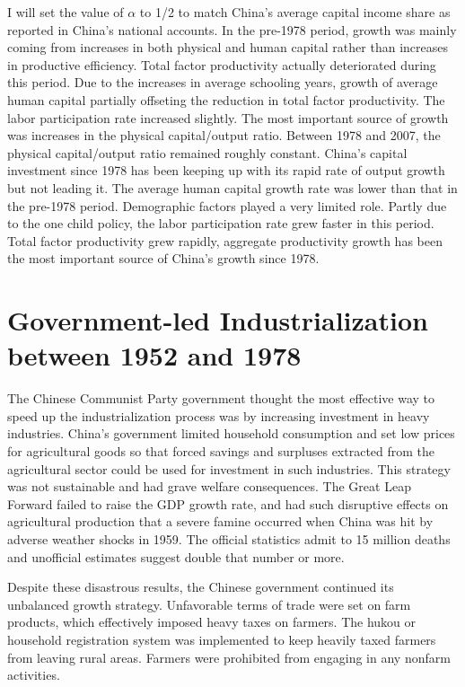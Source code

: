 \documentclass{article}
\begin{document}
    I will set the value of $\alpha$ to 1/2 to match China’s average capital income share as reported in China’s national accounts. In the pre-1978 period, growth was mainly coming from increases in both physical and human capital rather than increases in productive efficiency. Total factor productivity actually deteriorated during this period. Due to the increases in average schooling years, growth of average human capital partially offseting the reduction in total factor productivity. The labor participation rate increased slightly. The most important source of growth was increases in the physical capital/output ratio. Between 1978 and 2007, the physical capital/output ratio remained roughly constant. China’s  capital investment since 1978 has been keeping up with its rapid rate of output growth but not leading it. The average human capital growth rate was lower than that in the pre-1978 period. Demographic factors played a very limited role. Partly due to the one child policy, the labor participation rate grew faster in this period. Total factor productivity grew rapidly, aggregate productivity growth has been the most important source of China’s growth since 1978.
    
    \section*{Government-led Industrialization between 1952 and 1978}
    The Chinese Communist Party government thought the most effective way to speed up the industrialization process was by increasing investment in heavy industries. China’s government limited household consumption and set low prices for agricultural goods so that forced savings and surpluses extracted from the agricultural sector could be used for investment in such industries. This strategy was not sustainable and had grave welfare consequences. The Great Leap Forward failed to raise the GDP growth rate, and had such disruptive effects on agricultural production that a severe famine occurred when China was hit by adverse weather shocks in 1959. The official statistics admit to 15 million deaths and unofficial estimates suggest double that number or more.

    Despite these disastrous results, the Chinese government continued its unbalanced growth strategy. Unfavorable terms of trade were set on farm products, which effectively imposed heavy taxes on farmers. The hukou or household registration system was implemented to keep heavily taxed farmers from leaving rural areas.  Farmers were prohibited from engaging in any nonfarm activities. 
\end{document}
